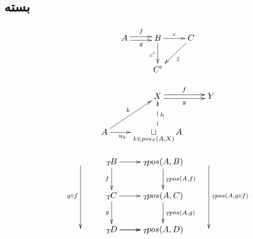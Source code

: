 %
%


\subsection{بسته }


\[
\xymatrix{
A \ar@<.5ex>[r]^f\ar@<-.5ex>[r]_g & B\ar[d]_{c'}\ar[r]^c & C\ar[ld]^{\overline{c}} \\
& C' & 
}
\]

\[
\xymatrix{
 & X\ar@<.5ex>[r]^{f}\ar@<-.5ex>[r]_{g} & Y\\
A \ar[r]_{u_k\qquad}\ar[ru]^k& \mathop{\sqcup}\limits_{k\in pos_S(A,X)}A\ar@{-->}_h[u]
}
\]

\[
\xymatrix{
\ar[dd]_{g\circ f} & _T\!B \ar[d]_{f}\ar[r] & _T\! pos(A,B)\ar[d]^{_T\! pos(A,f)} & \ar[dd]^{_T\! pos(A,g\circ f)}\\
& _T\!C\ar[r]\ar[d]_{g} & _T\! pos(A,C)\ar[d]^{_T\! pos(A,g)} & \\
& _T\!D\ar[r] \ar[r] & _T\! pos(A,D) &
}
\]


